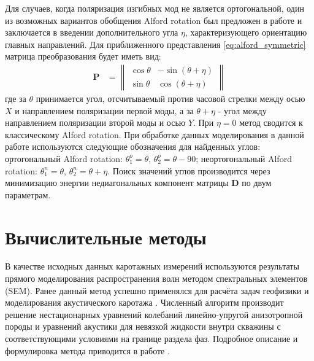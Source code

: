 \documentclass[a4paper,11pt]{article}
\begin{document}
Для случаев, когда поляризация изгибных мод не является ортогональной, один из возможных вариантов обобщения Alford rotation был предложен в работе \cite{Dellinger1998} и заключается в введении дополнительного угла $\eta$, характеризующего ориентацию главных направлений. Для приближенного представления \eqref{eq:alford_symmetric} матрица преобразования будет иметь вид:
\begin{align*}
\mathbf{P} &= \left\|
\begin{array}{cc}
\cos \theta & -\sin (\theta+\eta) \\ 
\sin \theta & \cos (\theta+\eta)
\end{array} 
\right\|
\end{align*}
где за $\theta$ принимается угол, отсчитываемый против часовой стрелки между осью $X$ и направлением поляризации первой моды, а за $\theta + \eta$ - угол между направлением поляризации второй моды и осью $Y$. При $\eta=0$ метод сводится к классическому Alford rotation. При обработке данных моделирования в данной работе используются следующие обозначения для найденных углов: ортогональный Alford rotation: $\theta_1^o=\theta$, $\theta_2^o=\theta-90$; неортогональный Alford rotation: $\theta_1^n=\theta$, $\theta_2^n=\theta+\eta$. Поиск значений углов производится через минимизацию энергии недиагональных компонент матрицы $\mathbf{D}$ по двум параметрам.


\section{Вычислительные методы}
В качестве исходных данных каротажных измерений используются результаты прямого моделирования распространения волн методом спектральных элементов (SEM). Ранее данный метод успешно применялся для расчёта задач геофизики \cite{Komatitsch1999} и моделирования акустического каротажа \cite{Charara2011}. Численный алгоритм производит решение нестационарных уравнений колебаний линейно-упругой анизотропной породы и уравнений акустики для невязкой жидкости внутри скважины с соответствующими условиями на границе раздела фаз. Подробное описание и формулировка метода приводится в работе \cite{Komatitsch1999}.
\end{document}

